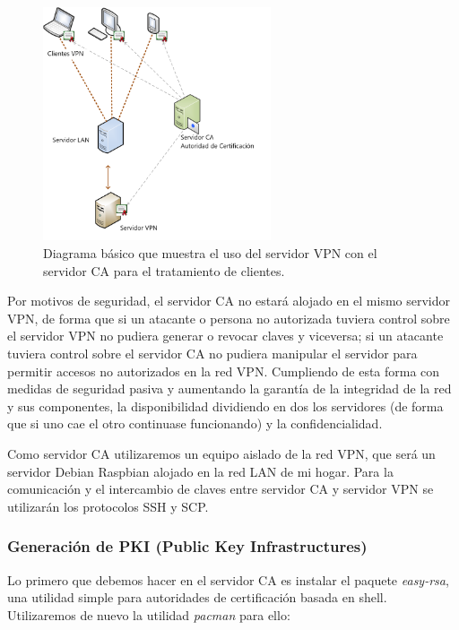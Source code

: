 \documentclass[a4paper, 11pt, titlepage]{article}
\begin{document}
        \begin{figure}[htp]
            \centering
            \includegraphics[width=0.6\textwidth]{resources/ca02.png}
            \caption{Diagrama básico que muestra el uso del servidor VPN con el servidor CA para el tratamiento de clientes.}
            \label{tuntap02}
        \end{figure}

        Por motivos de seguridad, el servidor CA no estará alojado en el mismo servidor VPN, de forma que si un atacante o persona no autorizada tuviera control sobre el 
        servidor VPN no pudiera generar o revocar claves y viceversa; si un atacante tuviera control sobre el servidor CA no pudiera manipular el servidor para permitir
        accesos no autorizados en la red VPN. Cumpliendo de esta forma con medidas de seguridad pasiva y aumentando la garantía de la integridad de la red y sus componentes,
        la disponibilidad dividiendo en dos los servidores (de forma que si uno cae el otro continuase funcionando) y la confidencialidad.

        Como servidor CA utilizaremos un equipo aislado de la red VPN, que será un servidor Debian Raspbian alojado en la red LAN de mi hogar. Para la comunicación y el
        intercambio de claves entre servidor CA y servidor VPN se utilizarán los protocolos SSH y SCP.

        \subsubsection{Generación de PKI (Public Key Infrastructures)}

            Lo primero que debemos hacer en el servidor CA es instalar el paquete \textit{easy-rsa}, una utilidad simple para autoridades de certificación basada en shell. 
            Utilizaremos de nuevo la utilidad \textit{pacman} para ello:
        
\end{document}
